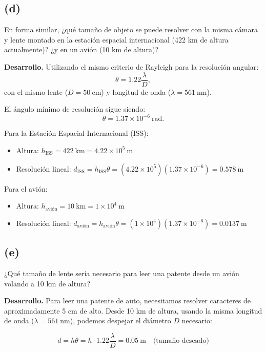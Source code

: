 \documentclass[11pt]{article}
\begin{document}
\subsection*{(d)}
En forma similar, ¿qué tamaño de objeto se puede resolver con la misma
cámara y lente montado en la estación espacial internacional (422 km de altura
actualmente)? ¿y en un avión (10 km de altura)?

\vspace{0.5em}
\noindent\textbf{Desarrollo.}
Utilizando el mismo criterio de Rayleigh para la resolución angular:
\[
\theta = 1.22 \frac{\lambda}{D},
\]
con el mismo lente (\(D = 50\ \mathrm{cm}\)) y longitud de onda (\(\lambda = 561\ \mathrm{nm}\)).

El ángulo mínimo de resolución sigue siendo:
\[
\theta = 1.37\times 10^{-6}\ \mathrm{rad}.
\]

Para la Estación Espacial Internacional (ISS):
\begin{itemize}
    \item Altura: \(h_{\text{ISS}} = 422\ \mathrm{km} = 4.22\times 10^5\ \mathrm{m}\)
    \item Resolución lineal: \(d_{\text{ISS}} = h_{\text{ISS}}\theta = (4.22\times 10^5)(1.37\times 10^{-6}) = 0.578\ \mathrm{m}\)
\end{itemize}

Para el avión:
\begin{itemize}
    \item Altura: \(h_{\text{avión}} = 10\ \mathrm{km} = 1\times 10^4\ \mathrm{m}\)
    \item Resolución lineal: \(d_{\text{avión}} = h_{\text{avión}}\theta = (1\times 10^4)(1.37\times 10^{-6}) = 0.0137\ \mathrm{m}\)
\end{itemize}

\subsection*{(e)}
¿Qué tamaño de lente sería necesario para leer una patente desde un
avión volando a 10 km de altura?

\vspace{0.5em}
\noindent\textbf{Desarrollo.}
Para leer una patente de auto, necesitamos resolver caracteres de aproximadamente 5 cm de alto. Desde 10 km de altura, usando la misma longitud de onda (\(\lambda = 561\ \mathrm{nm}\)), podemos despejar el diámetro \(D\) necesario:

\[
d = h\theta = h\cdot 1.22\frac{\lambda}{D} = 0.05\ \mathrm{m} \quad\text{(tamaño deseado)}
\]
\end{document}
